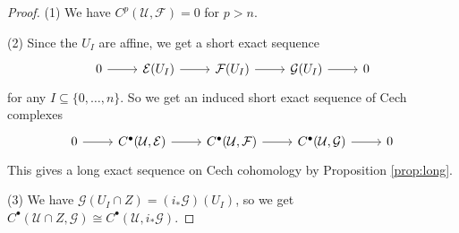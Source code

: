 \begin{proof}
  (1) We have $C^p(\mathcal{U}, \mathcal{F}) = 0$ for $p > n$.
  
  (2) Since the $U_I$ are affine, we get a
  short exact sequence
  \[
    \begin{tikzcd}
      0 \ar[r] & \mathcal{E}(U_I) \ar[r] & \mathcal{F}(U_I) \ar[r] & \mathcal{G}(U_I) \ar[r] & 0
    \end{tikzcd}
  \]
  for any $I \subseteq \{0, \dots, n\}$.
  So we get an induced short exact sequence
  of Cech complexes
  \[
    \begin{tikzcd}
      0 \ar[r] & C^\bullet(\mathcal{U}, \mathcal{E}) \ar[r] & C^\bullet(\mathcal{U}, \mathcal{F}) \ar[r] & C^\bullet(\mathcal{U}, \mathcal{G}) \ar[r] & 0
    \end{tikzcd}
  \]
  This gives a long exact sequence on
  Cech cohomology by Proposition
  \ref{prop:long}.

  (3) We have
  $\mathcal{G}(U_I \cap Z) = (i_* \mathcal{G})(U_I)$,
  so we get
  $C^\bullet(\mathcal{U} \cap Z, \mathcal{G}) \cong C^\bullet(\mathcal{U}, i_* \mathcal{G})$.
\end{proof}
